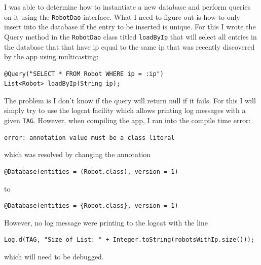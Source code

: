 \documentclass[fontsize=11pt, %
                             paper=a4, %
                             twoside, %
                             captions=tableheading,
                             index=totoc,
                             hyperref]{labbook}
\begin{document}
\begin{addmargin}[0cm]{0cm}
I was able to determine how to instantiate a new database and perform queries on it using the \texttt{RobotDao} interface. What I need to figure out is how to only insert into the database if the entry to be inserted is unique. For this I wrote the Query method in the \texttt{RobotDao} class titled \texttt{loadByIp} that will select all entries in the database that that have ip equal to the same ip that was recently discovered by the app using multicasting:
\begin{Verbatim}
@Query("SELECT * FROM Robot WHERE ip = :ip")
List<Robot> loadByIp(String ip);
\end{Verbatim}
The problem is I don't know if the query will return null if it fails. For this I will simply try to use the logcat facility which allows printing log messages with a given \texttt{TAG}.
\medbreak\noindent
However, when compiling the app, I ran into the compile time error:
\begin{Verbatim}
error: annotation value must be a class literal
\end{Verbatim}
which was resolved by changing the annotation 
\begin{Verbatim}
@Database(entities = (Robot.class), version = 1)
\end{Verbatim}
to 
\begin{Verbatim}
@Database(entities = {Robot.class}, version = 1)
\end{Verbatim}
However, no log message were printing to the logcat with the line 
\begin{Verbatim}
Log.d(TAG, "Size of List: " + Integer.toString(robotsWithIp.size()));
\end{Verbatim}
which will need to be debugged.


\end{addmargin}
\end{document}
